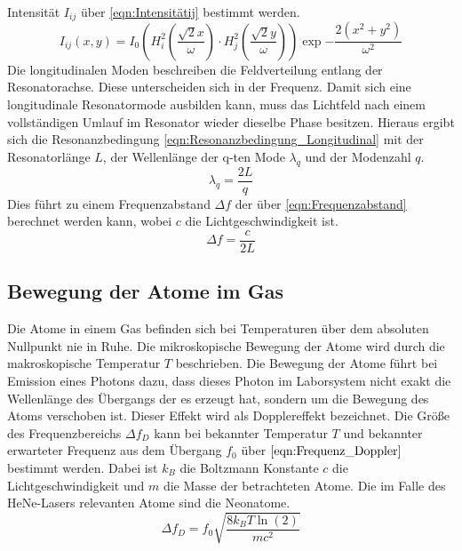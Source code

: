 Intensität $I_{ij}$ über \ref{eqn:Intensitätij} bestimmt werden.
\begin{equation}
	I_{ij}(x, y) = I_0 \left(H_i^2\left(\frac{\sqrt{2}x}{\omega}\right) \cdot H_j^2\left(\frac{\sqrt{2}y}{\omega}\right)\right) \exp{-\frac{2(x^2+y^2)}{\omega^2}}
\label{eqn:Intensitätij}
\end{equation}
Die longitudinalen Moden beschreiben die Feldverteilung entlang der Resonatorachse. Diese unterscheiden sich in der Frequenz. Damit sich eine longitudinale Resonatormode ausbilden kann, muss das Lichtfeld nach einem vollständigen Umlauf
im Resonator wieder dieselbe Phase besitzen. Hieraus ergibt sich die Resonanzbedingung \ref{eqn:Resonanzbedingung_Longitudinal} mit der Resonatorlänge $L$, der Wellenlänge der q-ten Mode $\lambda_q$ und der Modenzahl $q$.
\begin{equation}
	\lambda_q = \frac{2L}{q}
	\label{eqn:Resonanzbedingung_Longitudinal}
\end{equation}
Dies führt zu einem Frequenzabstand $\Delta f$ der über \ref{eqn:Frequenzabstand} berechnet werden kann, wobei $c$ die Lichtgeschwindigkeit ist.
\begin{equation}
	\Delta f = \frac{c}{2L}
	\label{eqn:Frequenzabstand}
\end{equation}



\subsection{Bewegung der Atome im Gas}
Die Atome in einem Gas befinden sich bei Temperaturen über dem absoluten Nullpunkt nie in Ruhe. Die mikroskopische Bewegung der Atome wird durch die makroskopische Temperatur $T$ beschrieben. Die Bewegung der Atome führt bei Emission eines 
Photons dazu, dass dieses Photon im Laborsystem nicht exakt die Wellenlänge des Übergangs der es erzeugt hat, sondern um die Bewegung des Atoms verschoben ist. Dieser Effekt wird als Dopplereffekt bezeichnet. Die Größe des Frequenzbereichs
$\Delta f_D$ kann bei bekannter Temperatur $T$ und bekannter erwarteter Frequenz aus dem Übergang $f_0$ über $\ref{eqn:Frequenz_Doppler}$ bestimmt werden. Dabei ist $k_B$ die Boltzmann Konstante $c$ die Lichtgeschwindigkeit und $m$ die Masse
der betrachteten Atome. Die im Falle des HeNe-Lasers relevanten Atome sind die Neonatome. 
\begin{equation}
	\Delta f_D = f_0 \sqrt{\frac{8k_BT\ln(2)}{mc^2}}
	\label{eqn:Frequenz_Doppler}
\end{equation}





\pagebreak
